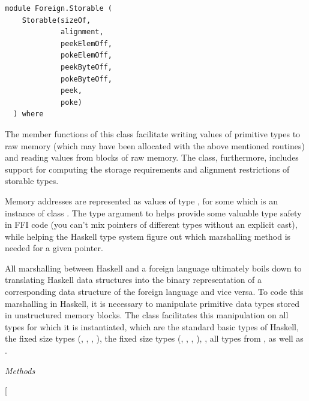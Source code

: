 \label{module:Foreign.Storable}
\haddockbeginheader
{\haddockverb\begin{verbatim}
module Foreign.Storable (
    Storable(sizeOf,
             alignment,
             peekElemOff,
             pokeElemOff,
             peekByteOff,
             pokeByteOff,
             peek,
             poke)
  ) where\end{verbatim}}
\haddockendheader

\begin{haddockdesc}
\item[\begin{tabular}{@{}l}
class Storable a where
\end{tabular}]
{\haddockbegindoc
The member functions of this class facilitate writing values of
primitive types to raw memory (which may have been allocated with the
above mentioned routines) and reading values from blocks of raw
memory.  The class, furthermore, includes support for computing the
storage requirements and alignment restrictions of storable types.\par
Memory addresses are represented as values of type , for some
 which is an instance of class .  The type argument to
 helps provide some valuable type safety in FFI code (you can't
mix pointers of different types without an explicit cast), while
helping the Haskell type system figure out which marshalling method is
needed for a given pointer.\par
All marshalling between Haskell and a foreign language ultimately
boils down to translating Haskell data structures into the binary
representation of a corresponding data structure of the foreign
language and vice versa.  To code this marshalling in Haskell, it is
necessary to manipulate primitive data types stored in unstructured
memory blocks.  The class  facilitates this manipulation on
all types for which it is instantiated, which are the standard basic
types of Haskell, the fixed size  types (, ,
, ), the fixed size  types (, ,
, ), , all types from ,
as well as .\par
\haddockpremethods{}\emph{Methods}
\begin{haddockdesc}
\item[\begin{tabular}{@{}l}

\end{tabular}
\end{haddockdesc}}
\end{haddockdesc}
